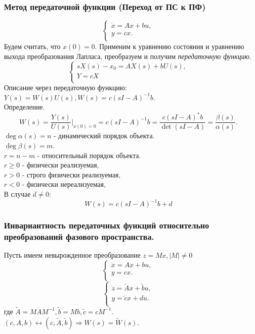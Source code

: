 \documentclass[A4]{article}
\begin{document}
\subsubsection{Метод передаточной функции (Переход от ПС к ПФ)}
\begin{equation}
\left\{\begin{array}{cc}
\dot{x}=Ax+bu,\\
y=cx.\\
\end{array}\right.
\end{equation}
Будем считать, что $x(0)=0$. Применим к уравнению состояния и уравнению выхода преобразования Лапласа, преобразуем и получим \emph{передаточную функцию}.
\begin{equation}
\left\{\begin{array}{cc}
sX(s)-x_0=AX(s)+bU(s),\\
Y=cX\\
\end{array}\right.
\end{equation}
Описание через передаточную функцию:\\ $Y(s)=W(s)U(s),W(s)=c(sI-A)^{-1}b$.\\
Определение. 
\begin{equation}
W(s)=\frac{Y(s)}{U(s)}\bigg|_{x(0)=0}=c(sI-A)^{-1}b=\frac{c(sI-A)^*b}{\det(sI-A)}=\frac{\beta(s)}{\alpha(s)}.
\end{equation}
$\deg \alpha(s)=n$ - динамический порядок объекта.\\
$\deg \beta(s)=m$.\\
$r=n-m$ - относительный порядок объекта.\\
$r\ge 0$ - физически реализуемая,\\
$r>0$ - строго физически реализуемая,\\
$r<0$ - физически нереализуемая,\\
В случае $d\ne 0$:
\begin{equation}
W(s)=c(sI-A)^{-1}b+d
\end{equation}
\subsubsection{Инвариантность передаточных функций относительно преобразований фазового пространства.}
Пусть имеем невырожденное преобразование $z=Mx,|M|\ne 0$\\
\begin{equation}
\left\{\begin{array}{cc}
\dot{x}=Ax+bu,\\
y=cx.\\
\end{array}\right.
\end{equation}
\begin{equation}
\left\{\begin{array}{cc}
\dot{z}=\tilde{A}x+\tilde{b}u,\\
y=\tilde{c}x+du.\\
\end{array}\right.
\end{equation}
где $\tilde{A}=MAM^{-1},\tilde{b}=Mb,\tilde{c}=cM^{-1}$.\\
$(c,A,b) \leftrightarrow (c,\tilde{A},\tilde{b}) \Rightarrow W(s)=\tilde{W}(s)$.
\end{document}
